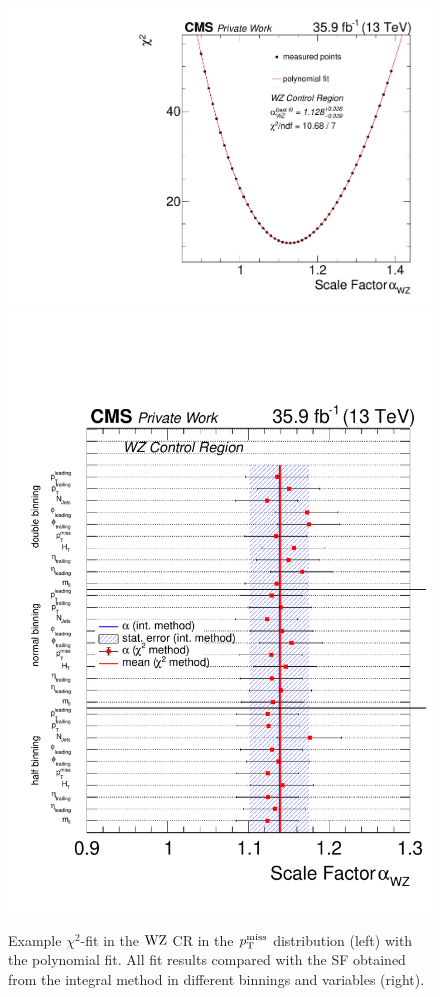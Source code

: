 \begin{figure}[tbp]
 \centering
 \includegraphics[width=\pairwidth]{figures/plots_CR/chi/WZ_met}
 \includegraphics[width=\pairwidth]{figures/plots_CR/chi/WZ_Compare}
 \caption{Example $\chi^2$-fit in the $\mathrm{W}\mathrm{Z}$ CR in the $p_{\mathrm{T}}^\text{miss}$ distribution (left) with the polynomial fit. All fit results compared with the SF obtained from the integral method in different binnings and variables (right).}
 \label{fig:chiWZ}
\end{figure}




